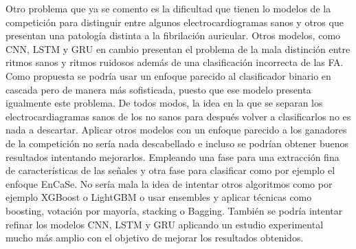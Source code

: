     Otro problema que ya se comento es la dificultad que tienen lo modelos de la competición para distinguir entre algunos electrocardiogramas sanos y otros que presentan una patología distinta a la fibrilación auricular. Otros modelos, como CNN, LSTM y GRU en cambio presentan el problema de la mala distinción entre ritmos sanos y ritmos ruidosos además de una clasificación incorrecta de las FA.  Como propuesta se podría usar un enfoque parecido al clasificador binario en cascada pero de manera más sofisticada, puesto que ese modelo presenta igualmente este problema. De todos modos, la idea en la que se separan los electrocardiagramas sanos de los no sanos para después volver a clasificarlos no es nada a descartar. Aplicar otros modelos con un enfoque parecido a los ganadores de la competición no sería nada descabellado e incluso se podrían obtener buenos resultados intentando mejorarlos. Empleando una fase para una extracción fina de características de las señales y otra fase para clasificar como por ejemplo el enfoque EnCaSe. No sería mala la idea de intentar otros algoritmos como por ejemplo XGBoost o LightGBM o usar ensembles y aplicar técnicas como boosting, votación por mayoría, stacking o Bagging. También se podría intentar refinar los modelos CNN, LSTM y GRU aplicando un estudio experimental mucho más amplio con el objetivo de mejorar los resultados obtenidos.  \\